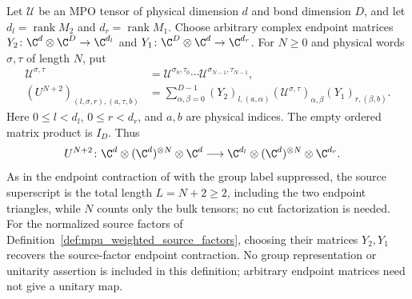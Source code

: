 \begin{definition}
    \label{def:mpug_truncated_symmetry}
    \leanok
    Let $\mathcal U$ be an MPO tensor of physical dimension $d$ and bond
    dimension $D$, and let $d_l=\operatorname{rank}M_2$ and
    $d_r=\operatorname{rank}M_1$. Choose arbitrary complex endpoint matrices
    $Y_2\colon\C^d\otimes\C^D\to\C^{d_l}$ and
    $Y_1\colon\C^D\otimes\C^d\to\C^{d_r}$.
    For $N\geq0$ and physical words $\sigma,\tau$ of length $N$, put
    \begin{align}
        \mathcal U^{\sigma,\tau}
         & =\mathcal U^{\sigma_0,\tau_0}\cdots\mathcal U^{\sigma_{N-1},\tau_{N-1}}, \\
        (U^{N+2})_{(l,\sigma,r),(a,\tau,b)}
         & =\sum_{\alpha,\beta=0}^{D-1}
        (Y_2)_{l,(a,\alpha)}
        (\mathcal U^{\sigma,\tau})_{\alpha,\beta}
        (Y_1)_{r,(\beta,b)}.
        \label{eq:mpug_truncated_symmetry_contraction}
    \end{align}
    Here $0\leq l<d_l$, $0\leq r<d_r$, and $a,b$ are physical
    indices. The empty ordered matrix product is $I_D$. Thus
    \begin{align}
        U^{N+2}\colon \C^d\otimes(\C^d)^{\otimes N}\otimes\C^d
         & \longrightarrow
        \C^{d_l}\otimes(\C^d)^{\otimes N}\otimes\C^{d_r}.
    \end{align}
    As in the endpoint contraction of
    \cite[lines~2062--2100]{FrancoRubio2025MPUGauging} with the group
    label suppressed, the source superscript is the total length
    $L=N+2\geq2$, including the two endpoint triangles, while $N$ counts
    only the bulk tensors; no cut factorization is needed.
    For the normalized source factors of
    Definition~\ref{def:mpu_weighted_source_factors}, choosing their
    matrices $Y_2,Y_1$ recovers the source-factor endpoint contraction.
    No group representation or unitarity assertion is included in this
    definition; arbitrary endpoint matrices need not give a unitary map.
\end{definition}

